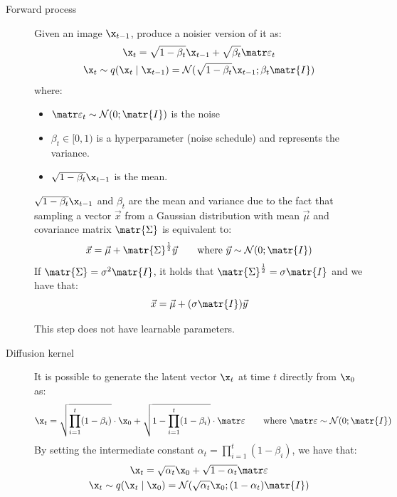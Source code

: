 \begin{description}
    \item[Forward process] 
        Given an image $\x_{t-1}$, produce a noisier version of it as:
        \[ 
            \begin{gathered}
                \x_t = \sqrt{1-\beta_t} \x_{t-1} + \sqrt{\beta_t}\noise_t \\
                \x_t \sim q(\x_t \mid \x_{t-1}) = \mathcal{N}(\sqrt{1-\beta_t}\x_{t-1}; \beta_t\matr{I})
            \end{gathered}
        \]
        where:
        \begin{itemize}
            \item $\noise_t \sim \mathcal{N}(0; \matr{I})$ is the noise
            \item $\beta_t \in [0,1)$ is a hyperparameter (noise schedule) and represents the variance.
            \item $\sqrt{1-\beta_t} \x_{t-1}$ is the mean.
        \end{itemize}

        \begin{remark}
            $\sqrt{1-\beta_t} \x_{t-1}$ and $\beta_t$ are the mean and variance due to the fact that sampling a vector $\vec{x}$ from a Gaussian distribution with mean $\vec{\mu}$ and covariance matrix $\matr{\Sigma}$ is equivalent to:
            \[ \vec{x} = \vec{\mu} + \matr{\Sigma}^{\frac{1}{2}}\vec{y} \qquad \text{where } \vec{y} \sim \mathcal{N}(0; \matr{I}) \]
            If $\matr{\Sigma} = \sigma^2\matr{I}$, it holds that $\matr{\Sigma}^{\frac{1}{2}} = \sigma \matr{I}$ and we have that:
            \[ \vec{x} = \vec{\mu} + (\sigma\matr{I})\vec{y} \]
        \end{remark}

        \begin{remark}
            This step does not have learnable parameters.
        \end{remark}

    \item[Diffusion kernel] 
        It is possible to generate the latent vector $\x_t$ at time $t$ directly from $\x_0$ as:
        \[ \x_t = \sqrt{\prod_{i=1}^{t}(1-\beta_i)} \cdot \x_0 + \sqrt{1-\prod_{i=1}^{t}(1-\beta_i)} \cdot \noise \qquad \text{where } \noise \sim \mathcal{N}(0; \matr{I}) \]
        By setting the intermediate constant $\alpha_t = \prod_{i=1}^{t}(1-\beta_i)$, we have that:
        \[ 
            \begin{gathered}
                \x_t = \sqrt{\alpha_t} \x_0 + \sqrt{1-\alpha_t}\noise \\
                \x_t \sim q(\x_t \mid \x_0) = \mathcal{N}(\sqrt{\alpha_t}\x_0; (1-\alpha_t)\matr{I})
            \end{gathered}
        \]


\end{description}
